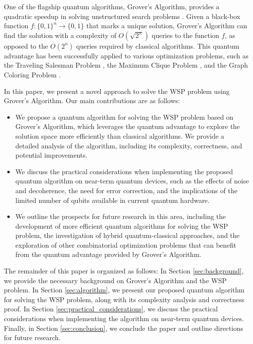 One of the flagship quantum algorithms, Grover's Algorithm, provides a quadratic speedup in solving unstructured search problems \cite{Grover1996}. Given a black-box function $f: \{0, 1\}^n \rightarrow \{0, 1\}$ that marks a unique solution, Grover's Algorithm can find the solution with a complexity of $O(\sqrt{2^n})$ queries to the function $f$, as opposed to the $O(2^n)$ queries required by classical algorithms. This quantum advantage has been successfully applied to various optimization problems, such as the Traveling Salesman Problem \cite{Gambetta2014}, the Maximum Clique Problem \cite{Mahloujifar2017}, and the Graph Coloring Problem \cite{Zhang2018}.

In this paper, we present a novel approach to solve the WSP problem using Grover's Algorithm. Our main contributions are as follows:

\begin{itemize}
    \item We propose a quantum algorithm for solving the WSP problem based on Grover's Algorithm, which leverages the quantum advantage to explore the solution space more efficiently than classical algorithms. We provide a detailed analysis of the algorithm, including its complexity, correctness, and potential improvements.
    
    \item We discuss the practical considerations when implementing the proposed quantum algorithm on near-term quantum devices, such as the effects of noise and decoherence, the need for error correction, and the implications of the limited number of qubits available in current quantum hardware.
    
    \item We outline the prospects for future research in this area, including the development of more efficient quantum algorithms for solving the WSP problem, the investigation of hybrid quantum-classical approaches, and the exploration of other combinatorial optimization problems that can benefit from the quantum advantage provided by Grover's Algorithm.
\end{itemize}

The remainder of this paper is organized as follows: In Section \ref{sec:background}, we provide the necessary background on Grover's Algorithm and the WSP problem. In Section \ref{sec:algorithm}, we present our proposed quantum algorithm for solving the WSP problem, along with its complexity analysis and correctness proof. In Section \ref{sec:practical_considerations}, we discuss the practical considerations when implementing the algorithm on near-term quantum devices. Finally, in Section \ref{sec:conclusion}, we conclude the paper and outline directions for future research.



